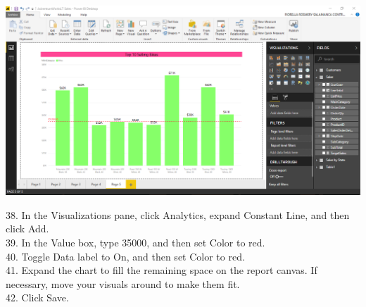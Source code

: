 	\begin{center}
	\includegraphics[width=17cm]{./Imagenes/Ejercicio2/Tarea1/5}
	\end{center}	

38. In the Visualizations pane, click Analytics, expand Constant Line, and then click Add.\\
39. In the Value box, type 35000, and then set Color to red.\\
40. Toggle Data label to On, and then set Color to red.\\
41. Expand the chart to fill the remaining space on the report canvas. If necessary, move your visuals
around to make them fit.\\
42. Click Save.\\